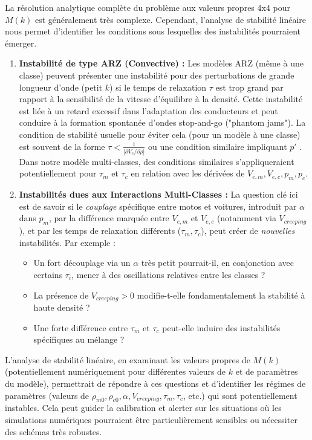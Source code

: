 La résolution analytique complète du problème aux valeurs propres 4x4 pour \( M(k) \) est généralement très complexe. Cependant, l'analyse de stabilité linéaire nous permet d'identifier les conditions sous lesquelles des instabilités pourraient émerger.
\begin{enumerate}
    \item \textbf{Instabilité de type ARZ (Convective) :} Les modèles ARZ (même à une classe) peuvent présenter une instabilité pour des perturbations de grande longueur d'onde (petit \( k \)) si le temps de relaxation \( \tau \) est trop grand par rapport à la sensibilité de la vitesse d'équilibre à la densité. Cette instabilité est liée à un retard excessif dans l'adaptation des conducteurs et peut conduire à la formation spontanée d'ondes stop-and-go ("phantom jams"). La condition de stabilité usuelle pour éviter cela (pour un modèle à une classe) est souvent de la forme \( \tau < \frac{1}{|\partial V_e / \partial \rho|} \) ou une condition similaire impliquant \(p'\) \cite{AwKlarMaterneRascle2000, BellettiEtAl2016}. Dans notre modèle multi-classes, des conditions similaires s'appliqueraient potentiellement pour \( \tau_m \) et \( \tau_c \) en relation avec les dérivées de \( V_{e,m}, V_{e,c}, p_m, p_c \).
    \item \textbf{Instabilités dues aux Interactions Multi-Classes :} La question clé ici est de savoir si le \textit{couplage} spécifique entre motos et voitures, introduit par \( \alpha \) dans \(p_m\), par la différence marquée entre \(V_{e,m}\) et \(V_{e,c}\) (notamment via \(V_{creeping}\)), et par les temps de relaxation différents (\(\tau_m, \tau_c\)), peut créer de \textit{nouvelles} instabilités. Par exemple :
        \begin{itemize}
            \item Un fort découplage via un \(\alpha\) très petit pourrait-il, en conjonction avec certains \(\tau_i\), mener à des oscillations relatives entre les classes ?
            \item La présence de \( V_{creeping} > 0 \) modifie-t-elle fondamentalement la stabilité à haute densité ?
            \item Une forte différence entre \(\tau_m\) et \(\tau_c\) peut-elle induire des instabilités spécifiques au mélange ?
        \end{itemize}
\end{enumerate}
L'analyse de stabilité linéaire, en examinant les valeurs propres de \( M(k) \) (potentiellement numériquement pour différentes valeurs de \( k \) et de paramètres du modèle), permettrait de répondre à ces questions et d'identifier les régimes de paramètres (valeurs de \(\rho_{m0}, \rho_{c0}, \alpha, V_{creeping}, \tau_m, \tau_c\), etc.) qui sont potentiellement instables. Cela peut guider la calibration et alerter sur les situations où les simulations numériques pourraient être particulièrement sensibles ou nécessiter des schémas très robustes.

